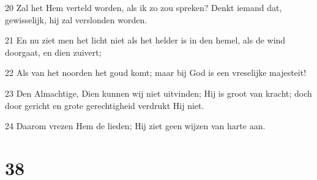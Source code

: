 \par 20 Zal het Hem verteld worden, als ik zo zou spreken? Denkt iemand dat, gewisselijk, hij zal verslonden worden.
\par 21 En nu ziet men het licht niet als het helder is in den hemel, als de wind doorgaat, en dien zuivert;
\par 22 Als van het noorden het goud komt; maar bij God is een vreselijke majesteit!
\par 23 Den Almachtige, Dien kunnen wij niet uitvinden; Hij is groot van kracht; doch door gericht en grote gerechtigheid verdrukt Hij niet.
\par 24 Daarom vrezen Hem de lieden; Hij ziet geen wijzen van harte aan.

\chapter{38}

